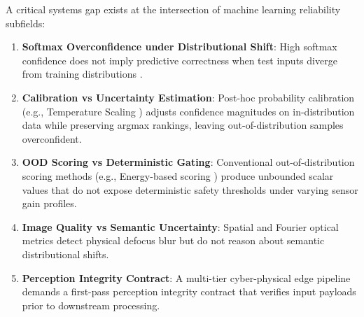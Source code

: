 \documentclass[conference]{IEEEtran}
\begin{document}
A critical systems gap exists at the intersection of machine learning reliability subfields:
\begin{enumerate}
    \item \textbf{Softmax Overconfidence under Distributional Shift}: High softmax confidence does not imply predictive correctness when test inputs diverge from training distributions \cite{hendrycks2016baseline}.
    \item \textbf{Calibration vs Uncertainty Estimation}: Post-hoc probability calibration (e.g., Temperature Scaling \cite{guo2017calibration}) adjusts confidence magnitudes on in-distribution data while preserving argmax rankings, leaving out-of-distribution samples overconfident.
    \item \textbf{OOD Scoring vs Deterministic Gating}: Conventional out-of-distribution scoring methods (e.g., Energy-based scoring \cite{liu2020energy}) produce unbounded scalar values that do not expose deterministic safety thresholds under varying sensor gain profiles.
    \item \textbf{Image Quality vs Semantic Uncertainty}: Spatial and Fourier optical metrics \cite{pech2000diatom, pertuz2013analysis} detect physical defocus blur but do not reason about semantic distributional shifts.
    \item \textbf{Perception Integrity Contract}: A multi-tier cyber-physical edge pipeline demands a first-pass perception integrity contract that verifies input payloads prior to downstream processing.
\end{enumerate}
\end{document}
